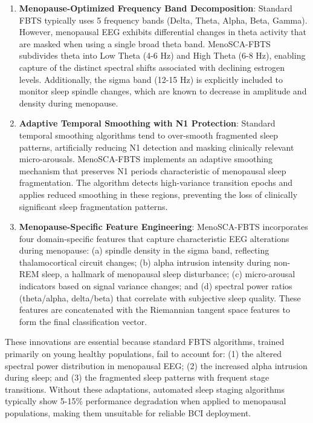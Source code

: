 \documentclass[a4paper,fleqn]{cas-dc}
\begin{document}
\begin{enumerate}
\item \textbf{Menopause-Optimized Frequency Band Decomposition}: Standard FBTS typically uses 5 frequency bands (Delta, Theta, Alpha, Beta, Gamma). However, menopausal EEG exhibits differential changes in theta activity that are masked when using a single broad theta band. MenoSCA-FBTS subdivides theta into Low Theta (4-6 Hz) and High Theta (6-8 Hz), enabling capture of the distinct spectral shifts associated with declining estrogen levels. Additionally, the sigma band (12-15 Hz) is explicitly included to monitor sleep spindle changes, which are known to decrease in amplitude and density during menopause.

\item \textbf{Adaptive Temporal Smoothing with N1 Protection}: Standard temporal smoothing algorithms tend to over-smooth fragmented sleep patterns, artificially reducing N1 detection and masking clinically relevant micro-arousals. MenoSCA-FBTS implements an adaptive smoothing mechanism that preserves N1 periods characteristic of menopausal sleep fragmentation. The algorithm detects high-variance transition epochs and applies reduced smoothing in these regions, preventing the loss of clinically significant sleep fragmentation patterns.

\item \textbf{Menopause-Specific Feature Engineering}: MenoSCA-FBTS incorporates four domain-specific features that capture characteristic EEG alterations during menopause: (a) spindle density in the sigma band, reflecting thalamocortical circuit changes; (b) alpha intrusion intensity during non-REM sleep, a hallmark of menopausal sleep disturbance; (c) micro-arousal indicators based on signal variance changes; and (d) spectral power ratios (theta/alpha, delta/beta) that correlate with subjective sleep quality. These features are concatenated with the Riemannian tangent space features to form the final classification vector.
\end{enumerate}

These innovations are essential because standard FBTS algorithms, trained primarily on young healthy populations, fail to account for: (1) the altered spectral power distribution in menopausal EEG; (2) the increased alpha intrusion during sleep; and (3) the fragmented sleep patterns with frequent stage transitions. Without these adaptations, automated sleep staging algorithms typically show 5-15\% performance degradation when applied to menopausal populations, making them unsuitable for reliable BCI deployment.
\end{document}
